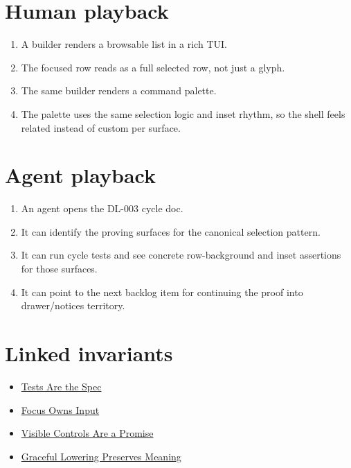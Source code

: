 \section{Human playback}\label{record-170-human-playback}

\begin{enumerate}
\def\labelenumi{\arabic{enumi}.}
\tightlist
\item
  A builder renders a browsable list in a rich TUI.
\item
  The focused row reads as a full selected row, not just a glyph.
\item
  The same builder renders a command palette.
\item
  The palette uses the same selection logic and inset rhythm, so the shell feels related instead of custom per surface.
\end{enumerate}

\section{Agent playback}\label{record-170-agent-playback}

\begin{enumerate}
\def\labelenumi{\arabic{enumi}.}
\tightlist
\item
  An agent opens the DL-003 cycle doc.
\item
  It can identify the proving surfaces for the canonical selection pattern.
\item
  It can run cycle tests and see concrete row-background and inset assertions for those surfaces.
\item
  It can point to the next backlog item for continuing the proof into drawer/notices territory.
\end{enumerate}

\section{Linked invariants}\label{record-170-linked-invariants}

\begin{itemize}
\tightlist
\item
  \href{https://github.com/flyingrobots/bijou/blob/cbd70612140e7a450d764b3c7be1c6af878b99bc/docs/invariants/tests-are-the-spec.md}{Tests Are the Spec}
\item
  \href{https://github.com/flyingrobots/bijou/blob/cbd70612140e7a450d764b3c7be1c6af878b99bc/docs/invariants/focus-owns-input.md}{Focus Owns Input}
\item
  \href{https://github.com/flyingrobots/bijou/blob/cbd70612140e7a450d764b3c7be1c6af878b99bc/docs/invariants/visible-controls-are-a-promise.md}{Visible Controls Are a Promise}
\item
  \href{https://github.com/flyingrobots/bijou/blob/cbd70612140e7a450d764b3c7be1c6af878b99bc/docs/invariants/graceful-lowering-preserves-meaning.md}{Graceful Lowering Preserves Meaning}
\end{itemize}

